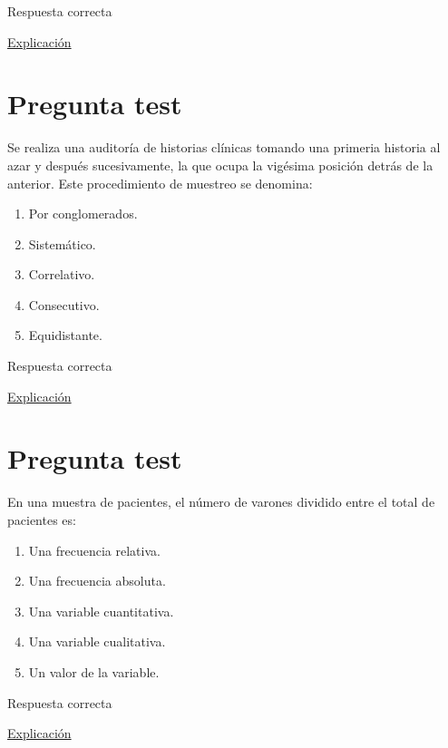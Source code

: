 \documentclass[
]{book}
\providecommand{\tightlist}{%
  \setlength{\itemsep}{0pt}\setlength{\parskip}{0pt}}
\begin{document}
Respuesta correcta

\href{https://escuelitamedica.com/2019/02/03/tipos-de-estudios-epidemiologicos-preguntas/}{Explicación}

\hypertarget{pregunta-test-2}{%
\section{Pregunta test}\label{pregunta-test-2}}

Se realiza una auditoría de historias clínicas tomando una primeria historia al azar y después sucesivamente, la que ocupa la vigésima posición detrás de la anterior. Este procedimiento de muestreo se denomina:

\begin{enumerate}
\def\labelenumi{\alph{enumi})}
\tightlist
\item
  Por conglomerados.
\item
  Sistemático.
\item
  Correlativo.
\item
  Consecutivo.
\item
  Equidistante.
\end{enumerate}

Respuesta correcta

\href{https://1fjmanzano.github.io/bioestadistica/me\%CC\%81todos-de-muestreo.html}{Explicación}

\hypertarget{pregunta-test-3}{%
\section{Pregunta test}\label{pregunta-test-3}}

En una muestra de pacientes, el número de varones dividido entre el total de pacientes es:

\begin{enumerate}
\def\labelenumi{\alph{enumi})}
\tightlist
\item
  Una frecuencia relativa.
\item
  Una frecuencia absoluta.
\item
  Una variable cuantitativa.
\item
  Una variable cualitativa.
\item
  Un valor de la variable.
\end{enumerate}

Respuesta correcta

\href{https://1fjmanzano.github.io/bioestadistica/tablas-de-frecuencias.html}{Explicación}
\end{document}
